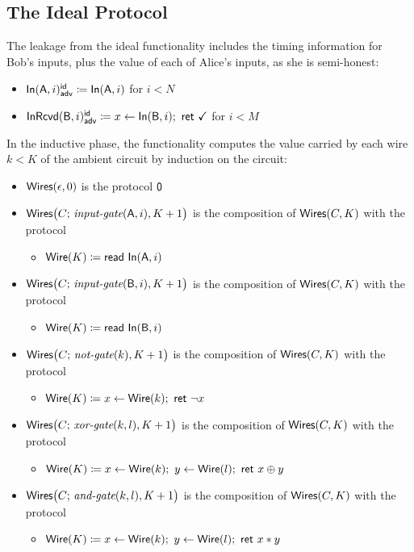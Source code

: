 \subsection{The Ideal Protocol}
The leakage from the ideal functionality includes the timing information for Bob's inputs, plus the value of each of Alice's inputs, as she is semi-honest:
\begin{itemize}
\item {\color{blue} $\mathsf{In}(\mathsf{A},i)^{\mathsf{id}}_{\mathsf{adv}} \coloneqq \mathsf{In}(\mathsf{A},i)$ for $i < N$}
\item {\color{blue} $\mathsf{InRcvd}(\mathsf{B},i)^{\mathsf{id}}_{\mathsf{adv}} \coloneqq x\leftarrow \mathsf{In}(\mathsf{B},i); \ \mathsf{ret} \ \checkmark$ for $i < M$}
\end{itemize}

\noindent In the inductive phase, the functionality computes the value carried by each wire $k < K$ of the ambient circuit by induction on the circuit:

\begin{itemize}
\item $\mathsf{Wires}(\epsilon,0)$ is the protocol $\mathsf{0}$
\item $\mathsf{Wires}\big(C; \, \textit{input-gate}(\mathsf{A},i),K+1\big)$ is the composition of $\mathsf{Wires}(C,K)$ with the protocol
\begin{itemize}
\item $\mathsf{Wire}(K) \coloneqq \mathsf{read} \ \mathsf{In}(\mathsf{A},i)$
\end{itemize}
\item $\mathsf{Wires}\big(C; \, \textit{input-gate}(\mathsf{B},i),K+1\big)$ is the composition of $\mathsf{Wires}(C,K)$ with the protocol
\begin{itemize}
\item $\mathsf{Wire}(K) \coloneqq \mathsf{read} \ \mathsf{In}(\mathsf{B},i)$
\end{itemize}
\item $\mathsf{Wires}\big(C; \, \textit{not-gate}(k),K+1\big)$ is the composition of $\mathsf{Wires}(C,K)$ with the protocol
\begin{itemize}
\item $\mathsf{Wire}(K) \coloneqq x \leftarrow \mathsf{Wire}(k); \ \mathsf{ret} \ \neg x$
\end{itemize}
\item $\mathsf{Wires}\big(C; \, \textit{xor-gate}(k,l),K+1\big)$ is the composition of $\mathsf{Wires}(C,K)$ with the protocol
\begin{itemize}
\item $\mathsf{Wire}(K) \coloneqq x \leftarrow \mathsf{Wire}(k); \ y \leftarrow \mathsf{Wire}(l); \ \mathsf{ret} \ x \oplus y$
\end{itemize}
\item $\mathsf{Wires}\big(C; \, \textit{and-gate}(k,l),K+1\big)$ is the composition of $\mathsf{Wires}(C,K)$ with the protocol
\begin{itemize}
\item $\mathsf{Wire}(K) \coloneqq x \leftarrow \mathsf{Wire}(k); \ y \leftarrow \mathsf{Wire}(l); \ \mathsf{ret} \ x * y$
\end{itemize}
\end{itemize}

